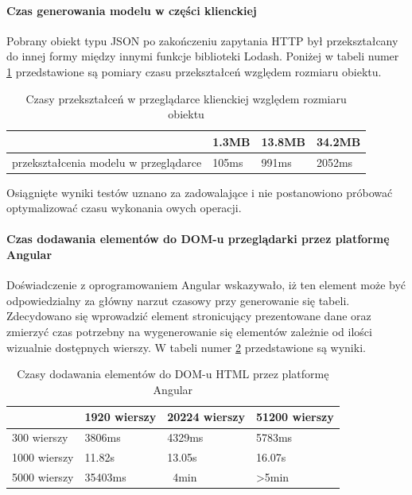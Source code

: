 \documentclass[a4paper,12pt,twoside]{article}
\begin{document}
\paragraph{Czas generowania modelu w części klienckiej} Pobrany obiekt typu JSON
po zakończeniu zapytania HTTP był przekształcany do innej formy między innymi
funkcje biblioteki Lodash. Poniżej w tabeli numer \ref{table:lodashTime} przedstawione są pomiary czasu przekształceń względem rozmiaru obiektu.

\begin{table} [H]
\begin{tabular}{| p{3cm} | p{3cm} | p{3cm} | p{3cm}|}
\hline
& 1.3MB&13.8MB& 34.2MB\\
\hline
przekształcenia modelu w przeglądarce& 105ms & 991ms& 2052ms\\ \hline
\end{tabular}
\caption{Czasy przekształceń w przeglądarce klienckiej względem rozmiaru obiektu}
\label{table:lodashTime}
\end{table}
Osiągnięte wyniki testów uznano za zadowalające i nie postanowiono
próbować optymalizować czasu wykonania owych operacji.

\paragraph{Czas dodawania elementów do DOM-u przeglądarki przez platformę Angular}
Doświadczenie z oprogramowaniem Angular wskazywało, iż ten element może być odpowiedzialny za główny narzut czasowy przy generowanie się tabeli.
Zdecydowano się wprowadzić element stronicujący prezentowane dane oraz
zmierzyć czas potrzebny na wygenerowanie się elementów zależnie od ilości
wizualnie dostępnych wierszy. W tabeli numer \ref{table:tableRender} przedstawione są
wyniki.

\begin{table} [H]
\begin{tabular}{| p{3cm} | p{3cm} | p{3cm} | p{3cm}|}
\hline
& 1920 wierszy & 20224 wierszy & 51200 wierszy\\
\hline
300 wierszy& 3806ms & 4329ms& 5783ms\\ \hline
1000 wierszy& 11.82s & 13.05s& 16.07s\\ \hline
5000 wierszy& 35403ms & ~4min& >5min\\ \hline
\end{tabular}
\caption{Czasy dodawania elementów do DOM-u HTML przez platformę Angular}
\label{table:tableRender}
\end{table}
\newpage
\end{document}

